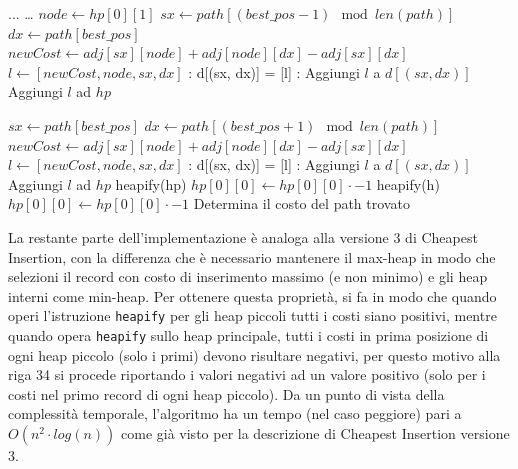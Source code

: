\documentclass[a4paper,12pt]{report}
\begin{document}
\begin{tcolorbox}[colframe=black, colback=white, boxrule=0.5pt, title=Furthest Insertion Versione 3, coltitle=black, fonttitle=\bfseries, colbacktitle=white, breakable]
  \begin{algorithmic}[1]
    \State ...
      \State \dots
        \State $node \gets hp[0][1]$
        \State $sx \gets path[(best\_pos - 1) \mod len(path)]$
        \State $dx \gets path[best\_pos]$
        \State $newCost \gets adj[sx][node] + adj[node][dx] - adj[sx][dx]$
        \State $l \gets [newCost, node, sx, dx]$
        :
        \State d[(sx, dx)] = [l]
        \Else{}:
        \State Aggiungi $l$ a $d[(sx, dx)]$
        \EndIf
        \State Aggiungi $l$ ad $hp$
        
        \State $sx \gets path[best\_pos]$
        \State $dx \gets path[(best\_pos + 1) \mod len(path)]$
        \State $newCost \gets adj[sx][node] + adj[node][dx] - adj[sx][dx]$
        \State $l \gets [newCost, node, sx, dx]$
        :
            \State d[(sx, dx)] = [l]
        \Else{}:
            \State Aggiungi $l$ a $d[(sx, dx)]$
        \EndIf
        \State Aggiungi $l$ ad $hp$
        \State heapify(hp)
        \State $hp[0][0] \gets hp[0][0] \cdot -1$
      \EndFor
      \State heapify(h)
        \State $hp[0][0] \gets hp[0][0] \cdot -1$
      \EndFor
    \EndWhile
    \State Determina il costo del path trovato
  \end{algorithmic}
\end{tcolorbox}
La restante parte dell'implementazione è analoga alla versione 3 di Cheapest Insertion, con la differenza che è necessario mantenere il max-heap in modo che selezioni il record con costo di inserimento massimo (e non minimo) e gli heap interni come min-heap. Per ottenere questa proprietà, si fa in modo che quando operi l'istruzione \lstinline!heapify! per gli heap piccoli tutti i costi siano positivi, mentre quando opera \lstinline!heapify! sullo heap principale, tutti i costi in prima posizione di ogni heap piccolo (solo i primi) devono risultare negativi, per questo motivo alla riga 34 si procede riportando i valori negativi ad un valore positivo (solo per i costi nel primo record di ogni heap piccolo). \newline
Da un punto di vista della complessità temporale, l'algoritmo ha un tempo (nel caso peggiore) pari a $O(n^2 \cdot log(n))$ come già visto per la descrizione di Cheapest Insertion versione 3.
\end{document}
